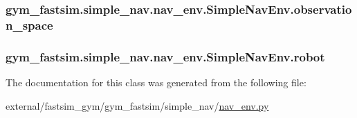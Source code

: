 \subsubsection[{\texorpdfstring{observation\+\_\+space}{observation_space}}]{\setlength{\rightskip}{0pt plus 5cm}gym\+\_\+fastsim.\+simple\+\_\+nav.\+nav\+\_\+env.\+Simple\+Nav\+Env.\+observation\+\_\+space}\hypertarget{classgym__fastsim_1_1simple__nav_1_1nav__env_1_1_simple_nav_env_a52bdd1b8acf3077ebf8ad2f397944512}{}\label{classgym__fastsim_1_1simple__nav_1_1nav__env_1_1_simple_nav_env_a52bdd1b8acf3077ebf8ad2f397944512}
\subsubsection[{\texorpdfstring{robot}{robot}}]{\setlength{\rightskip}{0pt plus 5cm}gym\+\_\+fastsim.\+simple\+\_\+nav.\+nav\+\_\+env.\+Simple\+Nav\+Env.\+robot}\hypertarget{classgym__fastsim_1_1simple__nav_1_1nav__env_1_1_simple_nav_env_a963bcfa11ccbd51373ef7762c9d5bbc7}{}\label{classgym__fastsim_1_1simple__nav_1_1nav__env_1_1_simple_nav_env_a963bcfa11ccbd51373ef7762c9d5bbc7}


The documentation for this class was generated from the following file\+:\begin{DoxyCompactItemize}
\item 
external/fastsim\+\_\+gym/gym\+\_\+fastsim/simple\+\_\+nav/\hyperlink{nav__env_8py}{nav\+\_\+env.\+py}\end{DoxyCompactItemize}
